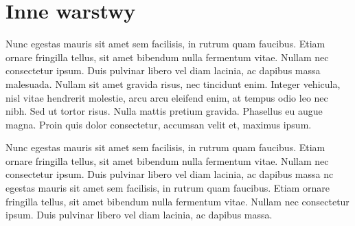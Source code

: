 \section{Inne warstwy}
Nunc egestas mauris sit amet sem facilisis, in rutrum quam faucibus. Etiam ornare fringilla tellus, sit amet bibendum nulla fermentum vitae. Nullam nec consectetur ipsum. Duis pulvinar libero vel diam lacinia, ac dapibus massa malesuada. Nullam sit amet gravida risus, nec tincidunt enim. Integer vehicula, nisl vitae hendrerit molestie, arcu arcu eleifend enim, at tempus odio leo nec nibh. Sed ut tortor risus. Nulla mattis pretium gravida. Phasellus eu augue magna. Proin quis dolor consectetur, accumsan velit et, maximus ipsum. 

Nunc egestas mauris sit amet sem facilisis, in rutrum quam faucibus. Etiam ornare fringilla tellus, sit amet bibendum nulla fermentum vitae. Nullam nec consectetur ipsum. Duis pulvinar libero vel diam lacinia, ac dapibus massa nc egestas mauris sit amet sem facilisis, in rutrum quam faucibus. Etiam ornare fringilla tellus, sit amet bibendum nulla fermentum vitae. Nullam nec consectetur ipsum. Duis pulvinar libero vel diam lacinia, ac dapibus massa.



